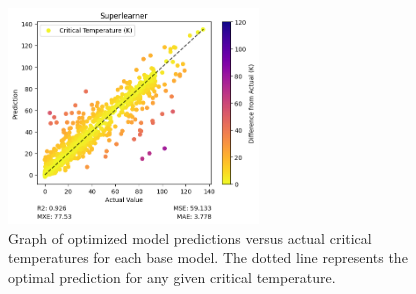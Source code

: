 \documentclass[twocolumn, nofootinbib, secnumarabic, amssymb, nobibnotes, aps, prd]{revtex4-2}
\begin{document}
\begin{figure}[t]
   \includegraphics[height=2.25in]{images/subfigures/no_uncertainty/superlearner.png}
   \caption{Graph of optimized model predictions versus actual critical temperatures for each base model. The dotted line represents the optimal prediction for any given critical temperature.}
   \label{fig:results}
\end{figure}%
\end{document}
